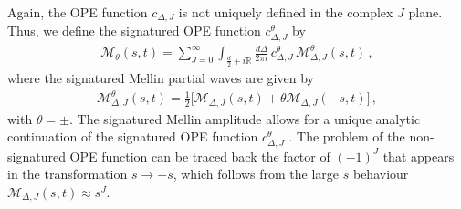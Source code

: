 Again, the OPE function $ c_{\Delta,J} $ is not uniquely defined in the complex $ J $ plane.
Thus, we define the signatured OPE function $ c_{\Delta,J}^{\theta} $ by
\begin{align}
  \mathcal{M}_{\theta} (s,t)
  =
  \displaystyle\sum_{J=0}^{\infty}
  \displaystyle\int_{\frac{d}{2}+i \mathbb{R}}
  \frac{d\Delta}{2\pi i}\,
  c_{\Delta,J}^{\theta}\,
  \mathcal{M}_{\Delta,J}^{\theta} (s,t)
  \,,
  \label{eq:signaturedMellin}
\end{align}
where the signatured Mellin partial waves are given by
\begin{align}
  \mathcal{M}_{\Delta,J}^{\theta} (s,t)
  =
  \frac{1}{2}
  \big[
    \mathcal{M}_{\Delta,J} (s,t)
    + \theta
    \mathcal{M}_{\Delta,J}(-s,t)
    \big]
  \,,
  \label{eq:signaturedMellinAmp4pt}
\end{align}
with $\theta=\pm$.
The signatured Mellin amplitude allows for a unique analytic continuation of the
signatured OPE function $ c_{\Delta,J}^{\theta} $ \cite{Caron-Huot:2017vep}.
The problem of the non-signatured OPE function can be traced back  the factor of $(-1)^J$ that appears
in the transformation $s\to-s$,
which follows
from the large $s$
behaviour $\mathcal{M}_{\Delta,J}(s,t) \approx s^J$.

